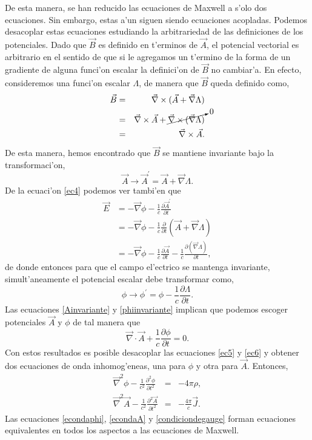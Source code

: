De esta manera, se han reducido las ecuaciones de Maxwell a s'olo dos ecuaciones. Sin embargo, estas a'un siguen siendo ecuaciones acopladas. Podemos desacoplar estas ecuaciones estudiando la arbitrariedad de las definiciones de los potenciales. Dado que $\vec{B}$ es definido en t'erminos de $\vec{A}$, el potencial vectorial es arbitrario en el sentido de que si le agregamos un t'ermino de la forma de un gradiente de alguna funci'on escalar la definici'on de $\vec{B}$ no cambiar'a. En efecto, consideremos una funci'on escalar $\Lambda$, de manera que $\vec{B}$ queda definido como,
\begin{eqnarray}
\vec{B}&=&\vec{\nabla}\times(\vec{A}+\vec{\nabla}\Lambda) \\
&=&\vec{\nabla}\times\vec{A}+\cancelto{0}{\vec{\nabla}\times(\vec{\nabla}\Lambda)} \\
&=&\vec{\nabla}\times\vec{A}.
\end{eqnarray}
De esta manera, hemos encontrado que $\vec{B}$ se mantiene invariante bajo la transformaci'on,
\begin{equation}
\vec{A}\rightarrow\vec{A}^\prime=\vec{A}+\vec{\nabla}\Lambda \label{Ainvariante}.
\end{equation}
De la ecuaci'on \eqref{ec4} podemos ver tambi'en que
\begin{equation}
\begin{aligned}
\vec{E}&=-\vec{\nabla}\phi-\frac{1}{c}\frac{\partial\vec{A}^\prime}{\partial t} \\
&=-\vec{\nabla}\phi-\frac{1}{c}\frac{\partial}{\partial t}(\vec{A}+\vec{\nabla}\Lambda) \\
&=-\vec{\nabla}\phi-\frac{1}{c}\frac{\partial\vec{A}}{\partial t}-\frac{1}{c}\frac{\partial(\vec{\nabla}\Lambda)}{\partial t},
\end{aligned}
\end{equation}
de donde entonces para que el campo el'ectrico se mantenga invariante, simult'aneamente el potencial escalar debe transformar como,
\begin{equation}
\phi\rightarrow\phi^\prime=\phi-\frac{1}{c}\frac{\partial \Lambda}{\partial t}. \label{phiinvariante}
\end{equation}
Las ecuaciones \eqref{Ainvariante} y \eqref{phiinvariante} implican que podemos escoger potenciales $\vec{A}$ y $\phi$ de tal manera que
\begin{equation}
\vec{\nabla}\cdot\vec{A}+\frac{1}{c}\frac{\partial \phi}{\partial t}=0. \label{condiciondegauge}
\end{equation}
Con estos resultados es posible desacoplar las ecuaciones \eqref{ec5} y \eqref{ec6} y obtener dos ecuaciones de onda inhomog'eneas, una para $\phi$ y otra para $\vec{A}$. Entonces,
\begin{eqnarray}
\vec{\nabla}^2\phi-\frac{1}{c^2}\frac{\partial^2 \phi}{\partial t^2}&=&-4\pi\rho, \label{econdaphi}\\ 
\vec{\nabla}^2\vec{A}-\frac{1}{c^2}\frac{\partial^2\vec{A}}{\partial t^2}&=&-\frac{4\pi}{c}\vec{J}. \label{econdaA}
\end{eqnarray}
Las ecuaciones \eqref{econdaphi}, \eqref{econdaA} y \eqref{condiciondegauge} forman ecuaciones equivalentes en todos los aspectos a las ecuaciones de Maxwell.
